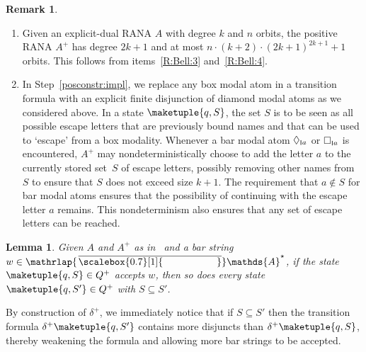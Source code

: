 \documentclass[10pt,a4paper]{amsart}
\newtheorem{lem}[theo]{Lemma}
\theoremstyle{definition}
\newtheorem{rem}[theo]{Remark}
\newcommand{\seq}{\subseteq}
\newcommand{\At}{\mathds{A}}
\newcommand{\barAs}{\barNames^{\star}}
\newcommand{\pos}[1]{{#1}^{+}}
\newcommand{\names}{\At}
\newcommand{\mybar}[3]{%
  \mathrlap{\hspace{#2}\overline{\scalebox{#1}[1]{\phantom{\ensuremath{#3}}}}}\ensuremath{#3}
}
\newcommand{\barNames}{{\mybar{0.7}{1.25pt}{\names}}}
\newcommand{\scriptmidmid}{\hspace{0.2ex}{\rule[-0.1ex]{0.6pt}{1.1ex}}\hspace{0.2ex}}
\newcommand{\scriptnew}[1]{{\scriptmidmid}#1}
\renewcommand{\enquote}[1]{`#1'}
\begin{document}
\begin{rem}
  \begin{enumerate}%
    \item Given an explicit-dual RANA $A$ with degree $k$ and $n$ orbits, the positive
      RANA $\pos{A}$ has degree $2k + 1$ and at most $n \cdot (k + 2) \cdot (2k + 1)^{2k + 1}+1$ orbits.
      This follows from  items~\ref{R:Bell:3} and~\ref{R:Bell:4}. 
      
    \item In Step~\ref{posconstr:impl}, we replace any box modal atom in a transition
      formula with an explicit finite disjunction of diamond modal atoms as we considered
      above. In a state $\maketuple{q, S}$, the set $S$ is to be seen as all possible
      escape letters that are previously bound names and that can be used to \enquote{escape}
      from a box modality. Whenever a bar modal atom $\Diamond_{\scriptnew{a}}$ or
      $\Box_{\scriptnew{a}}$ is encountered, $\pos{A}$ may nondeterministically choose
      to add the letter $a$ to the currently stored set~$S$ of escape letters, possibly
      removing other names from~$S$ to ensure that $S$ does not exceed size $k+1$. 
      The requirement that $a \notin S$ for bar modal atoms ensures that the possibility
      of continuing with the escape letter $a$ remains. This
      nondeterminism also ensures that any set of escape letters can be reached.
  \end{enumerate}
\end{rem}

\begin{lem}\label{lem:relStatesPos}
  Given $A$ and $\pos{A}$ as in~ and a
  bar string $w \in \barAs$, if the state $\maketuple{q,S} \in \pos{Q}$
  accepts $w$, then so does every state $\maketuple{q,S'} \in \pos{Q}$ with $S \seq S'$.
\end{lem}
\begin{IEEEproof}
  By construction of $\pos\delta$, we immediately notice that
  if $S \seq S'$ then the transition formula $\pos\delta\maketuple{q,S'}$
  contains more disjuncts than $\pos\delta\maketuple{q,S}$,
  thereby weakening the formula and allowing more bar strings to be accepted.
\end{IEEEproof}
\end{document}
